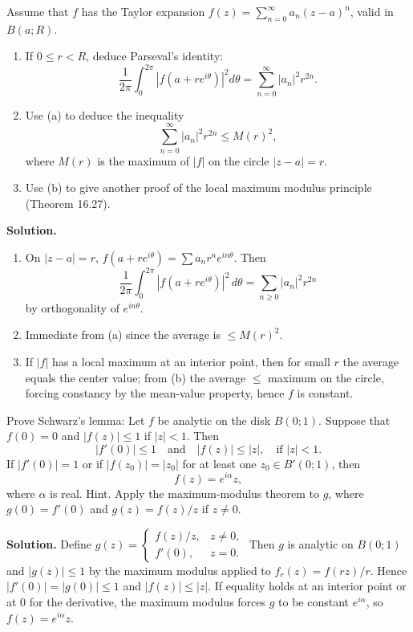 \begin{problembox}
Assume that \( f \) has the Taylor expansion \( f(z) = \sum_{n=0}^{\infty} a_n (z - a)^n \), valid in \( B(a; R) \).
\begin{enumerate}[label=(\alph*)]
\item If \( 0 \leq r < R \), deduce Parseval's identity:
\[ \frac{1}{2\pi} \int_0^{2\pi} |f(a + r e^{i\theta})|^2 d\theta = \sum_{n=0}^{\infty} |a_n|^2 r^{2n}. \]
\item Use (a) to deduce the inequality
\[ \sum_{n=0}^{\infty} |a_n|^2 r^{2n} \leq M(r)^2, \]
where \( M(r) \) is the maximum of \( |f| \) on the circle \( |z - a| = r \).
\item Use (b) to give another proof of the local maximum modulus principle (Theorem 16.27).
\end{enumerate}
\end{problembox}

\noindent\textbf{Solution.}
\begin{enumerate}[label=(\alph*)]
\item On $|z-a|=r$, $f(a+re^{i\theta})=\sum a_n r^n e^{in\theta}$. Then
\[\frac{1}{2\pi}\int_0^{2\pi}|f(a+re^{i\theta})|^2\,d\theta=\sum_{n\ge0}|a_n|^2 r^{2n}\]
by orthogonality of $e^{in\theta}$.
\item Immediate from (a) since the average is $\le M(r)^2$.
\item If $|f|$ has a local maximum at an interior point, then for small $r$ the average equals the center value; from (b) the average $\le$ maximum on the circle, forcing constancy by the mean-value property, hence $f$ is constant.
\end{enumerate}

\begin{problembox}
Prove Schwarz's lemma: Let \( f \) be analytic on the disk \( B(0; 1) \). Suppose that \( f(0) = 0 \) and \( |f(z)| \leq 1 \) if \( |z| < 1 \). Then
\[ |f'(0)| \leq 1 \quad \text{and} \quad |f(z)| \leq |z|, \quad \text{if } |z| < 1. \]
If \( |f'(0)| = 1 \) or if \( |f(z_0)| = |z_0| \) for at least one \( z_0 \in B'(0; 1) \), then
\[ f(z) = e^{i\alpha} z, \]
where \( \alpha \) is real. Hint. Apply the maximum-modulus theorem to \( g \), where \( g(0) = f'(0) \) and \( g(z) = f(z)/z \) if \( z \neq 0 \).
\end{problembox}

\noindent\textbf{Solution.}
Define $g(z)=\begin{cases} f(z)/z,& z\ne0,\\ f'(0),& z=0.\end{cases}$ Then $g$ is analytic on $B(0;1)$ and $|g(z)|\le1$ by the maximum modulus applied to $f_r(z)=f(rz)/r$. Hence $|f'(0)|=|g(0)|\le1$ and $|f(z)|\le |z|$. If equality holds at an interior point or at $0$ for the derivative, the maximum modulus forces $g$ to be constant $e^{i\alpha}$, so $f(z)=e^{i\alpha}z$.

